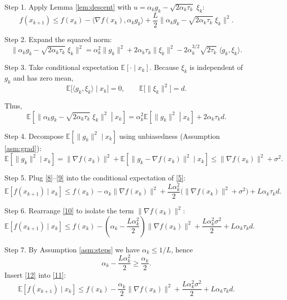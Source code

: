 \documentclass{article}
\newcommand{\E}{\mathbb{E}}
\newcommand{\ip}[2]{\langle #1,#2\rangle}
\begin{document}
\begin{enumerate}
\item[Step 1.] Apply Lemma \ref{lem:descent} with $u = \alpha_{k}g_{k}-\sqrt{2\alpha_{k}\tau_{k}}\;\xi_{k}$:
\[
f(x_{k+1})\le f(x_{k})-\ip{\nabla f(x_{k})}{\alpha_{k}g_{k}}+\frac{L}{2}\bigl\|\alpha_{k}g_{k}-\sqrt{2\alpha_{k}\tau_{k}}\;\xi_{k}\bigr\|^{2}.
\tag{5}
\]

\item[Step 2.] Expand the squared norm:
\[
\bigl\|\alpha_{k}g_{k}-\sqrt{2\alpha_{k}\tau_{k}}\;\xi_{k}\bigr\|^{2}
= \alpha_{k}^{2}\|g_{k}\|^{2}+2\alpha_{k}\tau_{k}\|\xi_{k}\|^{2}
-2\alpha_{k}^{3/2}\sqrt{2\tau_{k}}\;\langle g_{k},\xi_{k}\rangle .
\tag{6}
\]

\item[Step 3.] Take conditional expectation $\E[\cdot\mid x_{k}]$.
Because $\xi_{k}$ is independent of $g_{k}$ and has zero mean,
\[
\E\bigl[\langle g_{k},\xi_{k}\rangle\mid x_{k}\bigr]=0,
\qquad
\E\bigl[\|\xi_{k}\|^{2}\bigr]=d.
\tag{7}
\]

Thus,
\[
\E\!\left[\bigl\|\alpha_{k}g_{k}-\sqrt{2\alpha_{k}\tau_{k}}\;\xi_{k}\bigr\|^{2}\!\middle|\! x_{k}\right]
= \alpha_{k}^{2}\E\!\left[\|g_{k}\|^{2}\!\middle|\! x_{k}\right] + 2\alpha_{k}\tau_{k}d .
\tag{8}
\]

\item[Step 4.] Decompose $\E[\|g_{k}\|^{2}\mid x_{k}]$ using unbiasedness (Assumption \ref{asm:grad}):
\[
\E\!\left[\|g_{k}\|^{2}\mid x_{k}\right]
= \|\nabla f(x_{k})\|^{2}
+ \E\!\left[\|g_{k}-\nabla f(x_{k})\|^{2}\mid x_{k}\right]
\le \|\nabla f(x_{k})\|^{2}+\sigma^{2}.
\tag{9}
\]

\item[Step 5.] Plug \eqref{8}–\eqref{9} into the conditional expectation of \eqref{5}:
\[
\E\!\left[f(x_{k+1})\mid x_{k}\right]
\le f(x_{k})-\alpha_{k}\|\nabla f(x_{k})\|^{2}
+\frac{L\alpha_{k}^{2}}{2}\bigl(\|\nabla f(x_{k})\|^{2}+\sigma^{2}\bigr)
+L\alpha_{k}\tau_{k}d .
\tag{10}
\]

\item[Step 6.] Rearrange \eqref{10} to isolate the term $\|\nabla f(x_{k})\|^{2}$:
\[
\E\!\left[f(x_{k+1})\mid x_{k}\right]
\le f(x_{k})
-\left(\alpha_{k}-\frac{L\alpha_{k}^{2}}{2}\right)\|\nabla f(x_{k})\|^{2}
+\frac{L\alpha_{k}^{2}\sigma^{2}}{2}+L\alpha_{k}\tau_{k}d .
\tag{11}
\]

\item[Step 7.] By Assumption \ref{asm:steps} we have $\alpha_{k}\le 1/L$, hence
\[
\alpha_{k}-\frac{L\alpha_{k}^{2}}{2}\ge \frac{\alpha_{k}}{2}.
\tag{12}
\]
Insert \eqref{12} into \eqref{11}:
\[
\E\!\left[f(x_{k+1})\mid x_{k}\right]
\le f(x_{k})-\frac{\alpha_{k}}{2}\|\nabla f(x_{k})\|^{2}
+\frac{L\alpha_{k}^{2}\sigma^{2}}{2}+L\alpha_{k}\tau_{k}d .
\tag{13}
\]


\end{enumerate}
\end{document}
